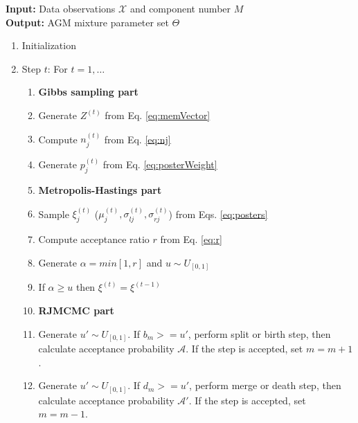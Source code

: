 \documentclass[conference]{IEEEtran}
\begin{document}



\noindent\textbf{Input:} Data observations $\mathcal{X}$ and component number $M$ \\
\textbf{Output:} AGM mixture parameter set $\Theta$
\begin{enumerate}
\item Initialization
\item Step $t$: For $t = 1,\ldots$
\begin{enumerate}
\item[]\textbf{Gibbs sampling part}
\item Generate $Z^{(t)}$ from Eq. \eqref{eq:memVector}
\item Compute $n_j^{(t)}$ from Eq. \eqref{eq:nj}
\item Generate $p_j^{(t)}$ from Eq. \eqref{eq:posterWeight}
\item[] \textbf{Metropolis-Hastings part}
\item Sample $\xi_j^{(t)}$ ($\mu_j^{(t)}, \sigma_{lj}^{(t)}, \sigma_{rj}^{(t)}$) from Eqs. \eqref{eq:posters}
\item Compute acceptance ratio $r$ from Eq. \eqref{eq:r}
\item Generate $\alpha = min[1,r]$ and $u \sim U_{[0,1]}$
\item If $\alpha \geq u$ then $\xi^{(t)} = \xi^{(t-1)}$
\item[] \textbf{RJMCMC part}
\item Generate $u' \sim U_{[0,1]}$. If $b_m>=u'$, perform split or birth step, then calculate acceptance probability $\mathcal{A}$. If the step is accepted, set $m=m+1$.
\item Generate $u' \sim U_{[0,1]}$. If $d_m>=u'$, perform merge or death step, then calculate acceptance probability $\mathcal{A}'$. If the step is accepted, set $m=m-1$.
\end{enumerate}
\end{enumerate}
\end{document}
